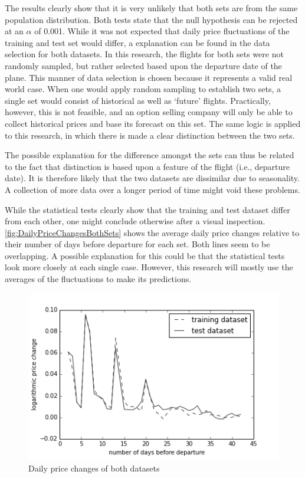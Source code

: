The results clearly show that it is very unlikely that both sets are from the same population distribution. Both tests state that the null hypothesis can be rejected at an $\alpha$ of 0.001. While it was not expected that daily price fluctuations of the training and test set would differ, a explanation can be found in the data selection for both datasets. In this research, the flights for both sets were not randomly sampled, but rather selected based upon the departure date of the plane. This manner of data selection is chosen because it represents a valid real world case. When one would apply random sampling to establish two sets, a single set would consist of historical as well as `future' flights. Practically, however, this is not feasible, and an option selling company will only be able to collect historical prices and base its forecast on this set. The same logic is applied to this research, in which there is made a clear distinction between the two sets.

The possible explanation for the difference amongst the sets can thus be related to the fact that distinction is based upon a feature of the flight (i.e., departure date). It is therefore likely that the two datasets are dissimilar due to seasonality. A collection of more data over a longer period of time might void these problems.

While the statistical tests clearly show that the training and test dataset differ from each other, one might conclude otherwise after a visual inspection. \autoref{fig:DailyPriceChangesBothSets} shows the average daily price changes relative to their number of days before departure for each set. Both lines seem to be overlapping. A possible explanation for this could be that the statistical tests look more closely at each single case. However, this research will mostly use the averages of the fluctuations to make its predictions.


\begin{figure}
\centering
\includegraphics[width=.8\textwidth]{figures/Train-Test_DailyReturns}
\caption{Daily price changes of both datasets}
\label{fig:DailyPriceChangesBothSets}
\end{figure}


